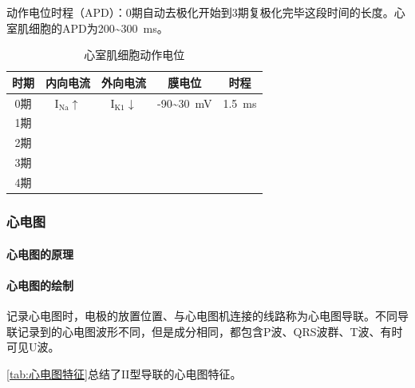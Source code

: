 动作电位时程（APD）：0期自动去极化开始到3期复极化完毕这段时间的长度。心室肌细胞的APD为200\textasciitilde\SI{300}{\ms}。

\begin{table}[htbp]
	\centering
	\begin{tabularx}{\textwidth}{|c|C|C|c|c|}
		\hline
		时期 & 内向电流 & 外向电流 & 膜电位 & 时程 \\ \hline
		0期 & I$_{\text{Na}}$$\uparrow$ & I$_{\text{K1}}$$\downarrow$ & -90\textasciitilde\SI{+30}{\mV} & \SI{1.5}{\ms} \\ \hline
		1期 &  &  &  &  \\ \hline
		2期 &  &  &  &  \\ \hline
		3期 &  &  &  &  \\ \hline
		4期 &  &  &  &  \\ \hline
	\end{tabularx}
	\caption{心室肌细胞动作电位}
	\label{tab:心室肌细胞动作电位}
\end{table}

\subsubsection{心电图}

\paragraph{心电图的原理}

\paragraph{心电图的绘制}

记录心电图时，电极的放置位置、与心电图机连接的线路称为心电图导联。不同导联记录到的心电图波形不同，但是成分相同，都包含P波、QRS波群、T波、有时可见U波。

\autoref{tab:心电图特征}总结了II型导联的心电图特征。


